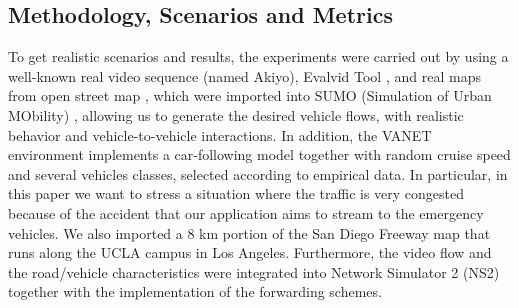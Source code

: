 \documentclass{acm_proc_article-sp}
\begin{document}
\subsection{Methodology, Scenarios and Metrics}
\label{methodology}
To get realistic scenarios and results, the experiments were carried out by using a well-known real video sequence (named Akiyo), Evalvid Tool \cite{evalvid}, and real maps from open street map \cite{openstreetmap}, which were imported into SUMO (Simulation of Urban MObility) \cite{SUMO}, allowing us to generate the desired vehicle flows, with realistic behavior and vehicle-to-vehicle interactions. In addition, the VANET environment implements a car-following model together with random cruise speed and several vehicles classes, selected according to empirical data. In particular, in this paper we want to stress a situation where the traffic is very congested because of the accident that our application aims to stream to the emergency vehicles. We also imported a 8 km portion of the San Diego Freeway map that runs along the UCLA campus in Los Angeles. Furthermore, the video flow and the road/vehicle characteristics were integrated into Network Simulator 2 (NS2) \cite{ns2} together with the implementation of the forwarding schemes.

\end{document}
